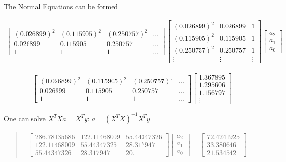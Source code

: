 The Normal Equations can be formed

\[\begin{aligned}
\begin{bmatrix}
 (0.026899)^2 & (0.115905)^2 & (0.250757)^2 & \dots \\
 0.026899& 0.115905 & 0.250757 & \dots \\
1 & 1 & 1 & \dots
\end{bmatrix}
\begin{bmatrix}
(0.026899)^2 & 0.026899 & 1\\
(0.115905)^2 & 0.115905 & 1\\
(0.250757)^2 & 0.250757 & 1\\
\vdots & \vdots & \vdots
\end{bmatrix}
\begin{bmatrix}
 a_2 \\ a_1 \\ a_0
\end{bmatrix}
\end{aligned}\]

\[\begin{aligned}
=
\begin{bmatrix}
 (0.026899)^2 & (0.115905)^2 & (0.250757)^2 & \dots \\
 0.026899& 0.115905 & 0.250757 & \dots \\
1 & 1 & 1 & \dots
\end{bmatrix}
\begin{bmatrix}
 1.367895\\
  1.295606\\
 1.156797\\
\vdots
\end{bmatrix}
\end{aligned}\]

One can solve \(X^TX a = X^T y\): \(a = (X^TX)^{-1} X^T y\)

\begin{quote}
\[\begin{aligned}
\begin{bmatrix}
286.78135686  & 122.11468009 &  55.44347326 \\
 122.11468009 &  55.44347326  & 28.317947 \\
  55.44347326 &  28.317947  &   20.
\end{bmatrix}
\begin{bmatrix}
a_2 \\ a_1 \\ a_0
\end{bmatrix}
=
\begin{bmatrix}
  72.4241925 \\  33.380646 \\ 21.534542
\end{bmatrix}
\end{aligned}\]
\end{quote}

